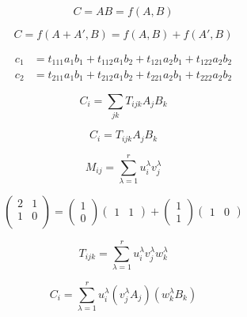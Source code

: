 
\begin{equation*}
	C = A B =  f(A, B)
\end{equation*}

\begin{equation*}
	C = f(A + A', B) = f(A, B) + f(A', B)
\end{equation*}

\begin{align*}
	c_1 &= t_{111} a_1 b_1 + t_{112} a_1 b_2 + t_{121} a_2 b_1 + t_{122} a_2 b_2 \\
	c_2 &= t_{211} a_1 b_1 + t_{212} a_1 b_2 + t_{221} a_2 b_1 + t_{222} a_2 b_2 
\end{align*}

\begin{equation*}
	C_i = \sum_{jk} T_{ijk} A_j B_k
\end{equation*}

\begin{equation*}
	C_i = T_{ijk} A_j B_k
\end{equation*}

\begin{equation*}
	M_{ij} = \sum_{\lambda = 1}^r u^\lambda_i v^\lambda_j
\end{equation*}

\begin{equation*}
	\begin{pmatrix}
	    2 & 1 \\
	    1 & 0 \\
	\end{pmatrix}
	= 
	\begin{pmatrix}1 \\ 0\end{pmatrix}\begin{pmatrix}1 & 1\end{pmatrix}
	+
	\begin{pmatrix}1 \\ 1\end{pmatrix}\begin{pmatrix}1 & 0\end{pmatrix}
\end{equation*}


\begin{equation*}
	T_{ijk} = \sum_{\lambda = 1}^r u^\lambda_i v^\lambda_j w^\lambda_k
\end{equation*}

\begin{equation*}
	C_i = \sum_{\lambda=1}^r u_i^\lambda (v_j^\lambda A_j) (w_k^\lambda B_k)
\end{equation*}